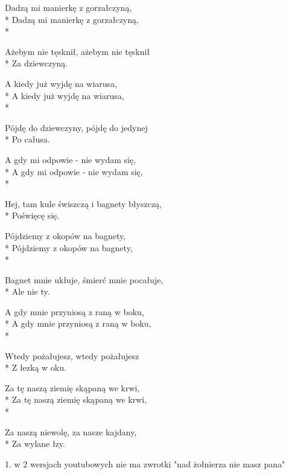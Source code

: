 \begin{lyrics}[longestline={Sto dwadzieścia kulek, sto dwadzieścia kulek}]
Dadzą mi manierkę z gorzałczyną,\\*
Dadzą mi manierkę z gorzałczyną,\\*
\begin{markverses}%
Ażebym nie tęsknił, ażebym nie tęsknił\\*
Za dziewczyną.
\end{markverses}

A kiedy już wyjdę na wiarusa,\\*
A kiedy już wyjdę na wiarusa,\\*
\begin{markverses}%
Pójdę do dziewczyny, pójdę do jedynej\\*
Po całusa.
\end{markverses}

A gdy mi odpowie - nie wydam się,\\*
A gdy mi odpowie - nie wydam się,\\*
\begin{markverses}%
Hej, tam kule świszczą i bagnety błyszczą,\\*
Poświęcę się.
\end{markverses}

Pójdziemy z okopów na bagnety,\\*
Pójdziemy z okopów na bagnety,\\*
\begin{markverses}%
Bagnet mnie ukłuje, śmierć mnie pocałuje,\\*
Ale nie ty.
\end{markverses}

A gdy mnie przyniosą z raną w boku,\\*
A gdy mnie przyniosą z raną w boku,\\*
\begin{markverses}%
Wtedy pożałujesz, wtedy pożałujesz\\*
Z łezką w oku.
\end{markverses}

Za tę naszą ziemię skąpaną we krwi,\\*
Za tę naszą ziemię skąpaną we krwi,\\*
\begin{markverses}%
Za naszą niewolę, za nasze kajdany,\\*
Za wylane łzy.
\end{markverses}
\end{lyrics}



\begin{info}1. w 2 wersjach youtubowych nie ma zwrotki "nad żołnierza nie masz pana"\end{info}

